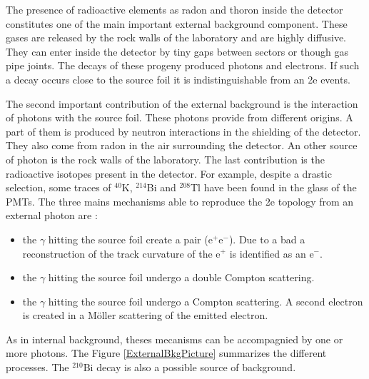 \documentclass[main.tex]{subfiles}
\begin{document}
\NI The presence of radioactive elements as radon and thoron inside the detector constitutes one of the main important external background component. These gases are released by the rock walls of the laboratory and are highly diffusive. They can enter inside the detector by tiny gaps between sectors or though gas pipe joints. The decays of these progeny produced photons and electrons. If such a decay occurs close to the source foil it is indistinguishable from an 2e events.


\bigskip


\NI The second important contribution of the external background is the interaction of photons with the source foil. These photons provide from different origins. A part of them is produced by neutron interactions in the shielding of the detector. They also come from radon in the air surrounding the detector. An other source of photon is the rock walls of the laboratory. The last contribution is the radioactive isotopes present in the detector. For example, despite a drastic selection, some traces of $^{\text{40}}$K, $^{\text{214}}$Bi and $^{\text{208}}$Tl have been found in the glass of the PMTs. The three mains mechanisms able to reproduce the 2e topology from an external photon are :   


\begin{itemize}
\item the $\gamma$ hitting the source foil create a pair (e$^+$e$^-$). Due to a bad a reconstruction of the track curvature of the e$^+$ is identified as an e$^-$.
\item the $\gamma$ hitting the source foil undergo a double Compton scattering.
\item the $\gamma$ hitting the source foil undergo a Compton scattering. A second electron is created in a M\"oller scattering of the emitted electron.
\end{itemize} 


\NI As in internal background, theses mecanisms can be accompagnied by one or more photons. The Figure \ref{ExternalBkgPicture}  summarizes the different processes. The $^{\text{210}}$Bi decay is also a possible source of background.
\end{document}
